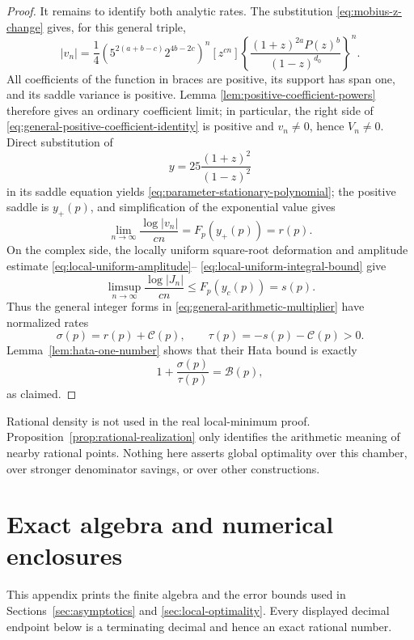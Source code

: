 \documentclass[11pt,reqno,letterpaper]{amsart}
\numberwithin{equation}{section}
\theoremstyle{definition}
\theoremstyle{remark}
\begin{document}
\begin{proof}
It remains to identify both analytic rates.  The substitution
\eqref{eq:mobius-z-change} gives, for this general triple,
\begin{equation}\label{eq:general-positive-coefficient-identity}
 |v_n|=\frac14
 \left(5^{2(a+b-c)}2^{4b-2c}\right)^n
 [z^{cn}]
 \left\{\frac{(1+z)^{2a}P(z)^b}{(1-z)^{d_0}}\right\}^{\!n}.
\end{equation}
All coefficients of the function in braces are positive, its support has
span one, and its saddle variance is positive.  Lemma
\ref{lem:positive-coefficient-powers} therefore gives an ordinary
coefficient limit; in particular, the right side of
\eqref{eq:general-positive-coefficient-identity} is positive and
\(v_n\ne0\), hence \(V_n\ne0\).  Direct substitution of
\begin{equation}\label{eq:general-y-z-bridge}
 y=25\frac{(1+z)^2}{(1-z)^2}
\end{equation}
in its saddle equation yields
\eqref{eq:parameter-stationary-polynomial}; the positive saddle is
\(y_+(p)\), and simplification of the exponential value gives
\[
 \lim_{n\to\infty}\frac{\log|v_n|}{cn}
 =F_p(y_+(p))=r(p).
\]
On the complex side, the locally uniform square-root deformation and
amplitude estimate \eqref{eq:local-uniform-amplitude}--%
\eqref{eq:local-uniform-integral-bound} give
\[
 \limsup_{n\to\infty}\frac{\log|J_n|}{cn}\leq
 F_p(y_c(p))=s(p).
\]
Thus the general integer forms in
\eqref{eq:general-arithmetic-multiplier} have normalized rates
\[
 \sigma(p)=r(p)+\mathcal C(p),\qquad
 \tau(p)=-s(p)-\mathcal C(p)>0.
\]
Lemma~\ref{lem:hata-one-number} shows that their Hata bound is exactly
\[
 1+\frac{\sigma(p)}{\tau(p)}=\mathcal B(p),
\]
as claimed.
\end{proof}

Rational density is not used in the real local-minimum proof.
Proposition~\ref{prop:rational-realization} only identifies the arithmetic
meaning of nearby rational points.  Nothing here asserts global
optimality over this chamber, over stronger denominator savings, or over
other constructions.


\appendix
\section{Exact algebra and numerical enclosures}\label{sec:exact-calculations}

This appendix prints the finite algebra and the error bounds used in
Sections~\ref{sec:asymptotics} and \ref{sec:local-optimality}.  Every
displayed decimal endpoint below is a terminating decimal and hence an
exact rational number.
\end{document}
